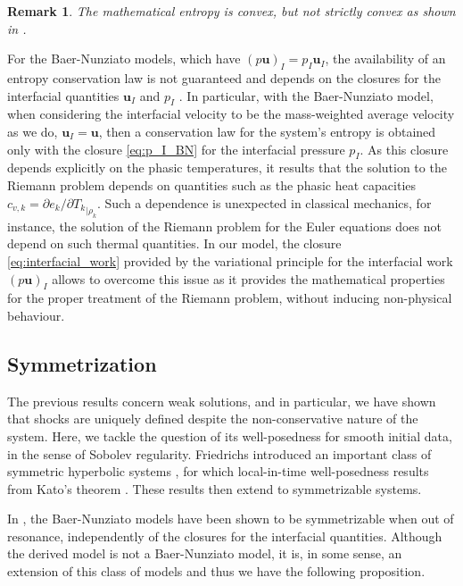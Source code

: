 \documentclass{myclass}
\newtheorem{remark}{\bf Remark}[section]
\newcommand{\vel}{\bm{u}}
\begin{document}
\begin{remark}
The mathematical entropy is convex, but not strictly convex as shown in \cite{coquel:2013}.
\end{remark}

For the Baer-Nunziato models, which have $(p\vel)_I=p_I \vel_I$, the availability of an entropy conservation law is not guaranteed and depends on the closures for the interfacial quantities $\vel_I$ and $p_I$ \cite{gallouet:2004}. In particular, with the Baer-Nunziato model, when considering the interfacial velocity to be the mass-weighted average velocity as we do, $\vel_I=\vel$, then a conservation law for the system's entropy is obtained only with the closure \eqref{eq:p_I_BN} for the interfacial pressure $p_I$. As this closure depends explicitly on the phasic temperatures, it results that the solution to the Riemann problem depends on quantities such as the phasic heat capacities $c_{v,k} = \partial e_k / \partial {T_k}_{|\rho_k}$. Such a dependence is unexpected in classical mechanics, for instance, the solution of the Riemann problem for the Euler equations does not depend on such thermal quantities. In our model, the closure \eqref{eq:interfacial_work} provided by the variational principle for the interfacial work $(p\vel)_I$ allows to overcome this issue as it provides the mathematical properties for the proper treatment of the Riemann problem, without inducing non-physical behaviour.     


\subsection{Symmetrization}

The previous results concern weak solutions, and in particular, we have shown that shocks are uniquely defined despite the non-conservative nature of the system. Here, we tackle the question of its well-posedness for smooth initial data, in the sense of Sobolev regularity. Friedrichs introduced an important class of symmetric hyperbolic systems \cite{friedrichs:1954}, for which local-in-time well-posedness results from Kato's theorem \cite{kato:1975}. These results then extend to symmetrizable systems. 

In \cite{coquel:2013}, the Baer-Nunziato models have been shown to be symmetrizable when out of resonance, independently of the closures for the interfacial quantities. Although the derived model is not a Baer-Nunziato model, it is, in some sense, an extension of this class of models and thus we have the following proposition.
\end{document}
